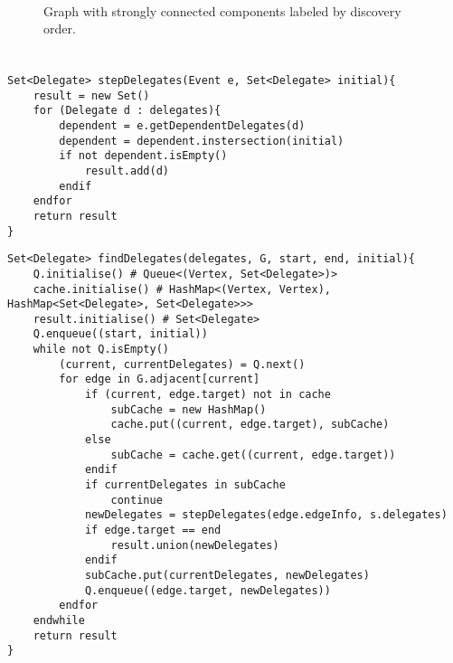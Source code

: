 \documentclass{article}
\begin{document}
\subsection{}

\subsection{}

\begin{figure}[H]
\centering
{}
\caption{Graph with strongly connected components labeled by discovery order.}
\end{figure}

\part{}
\section{}
\subsection{}
\begin{verbatim}
Set<Delegate> stepDelegates(Event e, Set<Delegate> initial){
    result = new Set()
    for (Delegate d : delegates){
        dependent = e.getDependentDelegates(d)
        dependent = dependent.instersection(initial)
        if not dependent.isEmpty()
            result.add(d)
        endif
    endfor
    return result
}
\end{verbatim}

\begin{verbatim}
Set<Delegate> findDelegates(delegates, G, start, end, initial){
    Q.initialise() # Queue<(Vertex, Set<Delegate>)>
    cache.initialise() # HashMap<(Vertex, Vertex), HashMap<Set<Delegate>, Set<Delegate>>>
    result.initialise() # Set<Delegate>
    Q.enqueue((start, initial))
    while not Q.isEmpty()
        (current, currentDelegates) = Q.next()
        for edge in G.adjacent[current]
            if (current, edge.target) not in cache
                subCache = new HashMap()
                cache.put((current, edge.target), subCache)
            else
                subCache = cache.get((current, edge.target))
            endif
            if currentDelegates in subCache
                continue
            newDelegates = stepDelegates(edge.edgeInfo, s.delegates)
            if edge.target == end
                result.union(newDelegates)
            endif
            subCache.put(currentDelegates, newDelegates)
            Q.enqueue((edge.target, newDelegates))
        endfor
    endwhile
    return result
}
\end{verbatim}

\subsection{}
\end{document}
